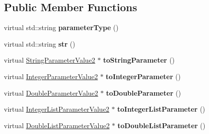 \subsection*{Public Member Functions}
\begin{DoxyCompactItemize}
\item 
\mbox{\label{classtops_1_1ProbabilisticModelParameterValue2_af7e9eca8899ccab589ce0603e7ee49c6}} 
virtual std\+::string {\bfseries parameter\+Type} ()
\item 
\mbox{\label{classtops_1_1ProbabilisticModelParameterValue2_aa514d6186ea6ee4ca6cfe999ff45a7e2}} 
virtual std\+::string {\bfseries str} ()
\item 
\mbox{\label{classtops_1_1ProbabilisticModelParameterValue2_a164d33717551f2afb646206d5ef2f6a7}} 
virtual \hyperlink{classtops_1_1StringParameterValue2}{String\+Parameter\+Value2} $\ast$ {\bfseries to\+String\+Parameter} ()
\item 
\mbox{\label{classtops_1_1ProbabilisticModelParameterValue2_ae015c26dd69d9c2e4d1baa0ef33a6c93}} 
virtual \hyperlink{classtops_1_1IntegerParameterValue2}{Integer\+Parameter\+Value2} $\ast$ {\bfseries to\+Integer\+Parameter} ()
\item 
\mbox{\label{classtops_1_1ProbabilisticModelParameterValue2_ae7a52388bf2315112005b9861f582178}} 
virtual \hyperlink{classtops_1_1DoubleParameterValue2}{Double\+Parameter\+Value2} $\ast$ {\bfseries to\+Double\+Parameter} ()
\item 
\mbox{\label{classtops_1_1ProbabilisticModelParameterValue2_a04678b4bc6b4cfaa51ec4a1ca7b9efe2}} 
virtual \hyperlink{classtops_1_1IntegerListParameterValue2}{Integer\+List\+Parameter\+Value2} $\ast$ {\bfseries to\+Integer\+List\+Parameter} ()
\item 
\mbox{\label{classtops_1_1ProbabilisticModelParameterValue2_a130f0c96528635c1d6ba91864427ba94}} 
virtual \hyperlink{classtops_1_1DoubleListParameterValue2}{Double\+List\+Parameter\+Value2} $\ast$ {\bfseries to\+Double\+List\+Parameter} ()

\end{DoxyCompactItemize}
